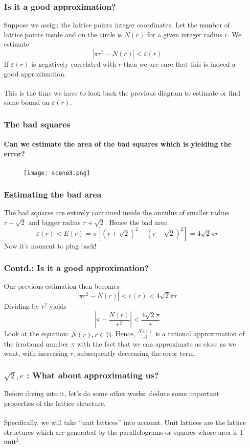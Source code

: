 \documentclass{beamer}
\begin{document}
    \begin{frame}
        \frametitle{Is it a good approximation?}
        Suppose we assign the lattice points integer coordinates. Let the number of lattice points inside and on the circle is \(N(r)\) for a given integer radius \(r\). We estimate \[|\pi r^2 - N(r)| < \varepsilon(r)\] If \(\varepsilon(r)\) is negatively correlated with \(r\) then we are sure that this is indeed a good approximation. \\~\\

        This is the time we have to look back the previous diagram to estimate or find some bound on \(\varepsilon(r)\).
    \end{frame}

    \begin{frame}
        \frametitle{The bad squares}
        \framesubtitle{Can we estimate the area of the bad squares which is yielding the error?}
        \begin{figure}
            \texttt{[image: scene3.png]}
        \end{figure}
    \end{frame}

    \begin{frame}
        \frametitle{Estimating the bad area}
        The bad squares are entirely contained inside the annulus of smaller radius \(r - \sqrt{2}\) and bigger radius \(r + \sqrt{2}\). Hence the bad area \[\varepsilon(r) < E(r) = \pi [(r+\sqrt{2})^2 - (r-\sqrt{2})^2] = 4 \sqrt{2} \pi r\] Now it's moment to plug back!
    \end{frame}

    \begin{frame}
        \frametitle{Contd.: Is it a good approximation?}
        Our previous estimation then becomes \[|\pi r^2 - N(r)| < \varepsilon(r) < 4 \sqrt{2} \pi r\] Dividing by \(r^2\) yields \[\left|\pi - \frac{N(r)}{r^2}\right| < \frac{4 \sqrt{2} \pi}{r}\] Look at the equation: \(N(r), r \in \mathbb{N}\). Hence, \(\frac{N(r)}{r^2}\) is a rational approximation of the irrational number \(\pi\) with the fact that we can approximate as close as we want, with increasing \(r\), subsequently decreasing the error term.
    \end{frame}

    \begin{frame}
        \frametitle{\(\sqrt{2}, e\) : What about approximating us?}

        Before diving into it, let's do some other works: deduce some important properties of the lattice structure. \\~\\

        Specifically, we will take ``unit lattices'' into account. Unit lattices are the lattice structures which are generated by the parallelograms or squares whose area is 1 unit\(^2\). 
    \end{frame}
\end{document}
